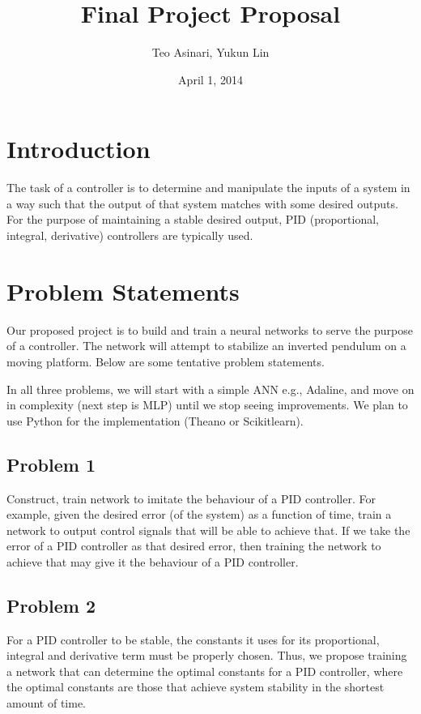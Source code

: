 \documentclass[11pt]{article}
\title{Final Project Proposal}
\author{Teo Asinari, Yukun Lin}
\date{April 1, 2014}
\begin{document}
\maketitle

\section{Introduction}

The task of a controller is to determine and manipulate the inputs of a system in a way
such that the output of that system matches with some desired outputs. For the purpose of
maintaining a stable desired output, PID (proportional, integral, derivative) controllers
are typically used.

\section{Problem Statements}
Our proposed project is to build and train a neural networks to serve the purpose of a
controller. The network will attempt to stabilize an inverted pendulum on a moving
platform. Below are some tentative problem statements.

In all three problems, we will start with a simple ANN e.g., Adaline, and move on in
complexity (next step is MLP) until we stop seeing improvements.  We plan to use Python
for the implementation (Theano or Scikitlearn).

\subsection{Problem 1}
Construct, train network to imitate the behaviour of a PID controller. For example, given
the desired error (of the system) as a function of time, train a network to output control
signals that will be able to achieve that. If we take the error of a PID controller as
that desired error, then training the network to achieve that may give it the behaviour of
a PID controller.

\subsection{Problem 2}
For a PID controller to be stable, the constants it uses for its proportional, integral
and derivative term must be properly chosen. Thus, we propose training a network that can
determine the optimal constants for a PID controller, where the optimal constants are
those that achieve system stability in the shortest amount of time.
\end{document}
